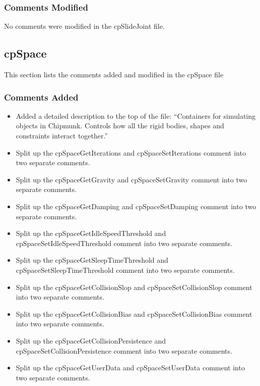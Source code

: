 \documentclass[12pt]{article}
\begin{document}
\subsubsection{Comments Modified}
No comments were modified in the cpSlideJoint file.


\subsection{cpSpace} 
This section lists the comments added and modified  in the cpSpace file

\subsubsection{Comments Added}
\begin{itemize}
\item Added a detailed description to the top of the file: ``Containers for simulating objects in Chipmunk. Controls how all the rigid bodies, shapes and
 constraints interact together.''
\item Split up the cpSpaceGetIterations and cpSpaceSetIterations comment into two separate comments.
\item Split up the cpSpaceGetGravity and cpSpaceSetGravity comment into two separate comments.
\item Split up the cpSpaceGetDamping and cpSpaceSetDamping comment into two separate comments.
\item Split up the cpSpaceGetIdleSpeedThreshold and cpSpaceSetIdleSpeedThreshold comment into two separate comments.
\item Split up the cpSpaceGetSleepTimeThreshold and cpSpaceSetSleepTimeThreshold comment into two separate comments.
\item Split up the cpSpaceGetCollisionSlop and cpSpaceSetCollisionSlop comment into two separate comments.
\item Split up the cpSpaceGetCollisionBias and cpSpaceSetCollisionBias comment into two separate comments.
\item Split up the cpSpaceGetCollisionPersistence and cpSpaceSetCollisionPersistence comment into two separate comments.
\item Split up the cpSpaceGetUserData and cpSpaceSetUserData comment into two separate comments.
\end{itemize}
\end{document}
